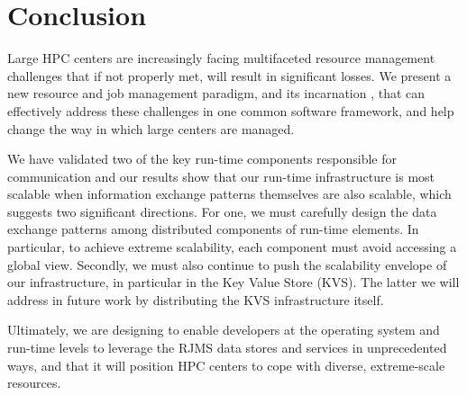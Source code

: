 \section{Conclusion}
Large HPC centers are increasingly facing 
multifaceted resource management challenges
that if not properly met, will result 
in significant losses.  
We present a new resource and job
management paradigm, and its incarnation \flux, that can effectively
address these challenges in one common software framework,
and help change the way in which large centers are managed.

We have validated two of the key run-time components responsible for communication
and our results show that our run-time 
infrastructure is most scalable when information 
exchange patterns themselves are also scalable, which suggests two significant directions. 
For one, we must carefully design the data exchange patterns
among distributed components of run-time elements. 
In particular, to achieve extreme scalability, each component 
must avoid accessing a global view.
Secondly, we must also continue to push the 
scalability envelope of our infrastructure, in particular in the
Key Value Store (KVS). The latter we will address in future work by 
distributing the KVS infrastructure itself.
%

Ultimately, we are designing \flux to  
enable developers at the operating system and
run-time levels to leverage the RJMS data stores and services in
unprecedented ways, and that it will position HPC centers to cope
with diverse, extreme-scale resources.
